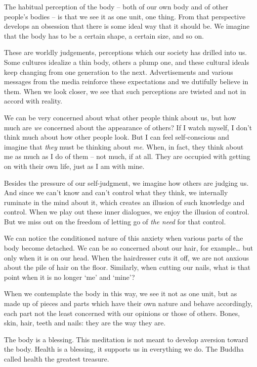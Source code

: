 The habitual perception of the body -- both of our own body and of other
people's bodies -- is that we see it as one unit, one thing. From that
perspective develops an obsession that there is some ideal way that it
should be. We imagine that the body has to be a certain shape, a certain
size, and so on.

These are worldly judgements, perceptions which our society has drilled
into us. Some cultures idealize a thin body, others a plump one, and
these cultural ideals keep changing from one generation to the next.
Advertisements and various messages from the media reinforce these
expectations and we dutifully believe in them. When we look closer, we
see that such perceptions are twisted and not in accord with reality.

We can be very concerned about what other people think about us, but how
much are \emph{we} concerned about the appearance of others? If I watch
myself, I don't think much about how other people look. But I can feel
self-conscious and imagine that \emph{they} must be thinking about
\emph{me}. When, in fact, they think about me as much as I do of them --
not much, if at all. They are occupied with getting on with their own
life, just as I am with mine.

Besides the pressure of our self-judgment, we imagine how others are
judging us. And since we can't know and can't control what they think,
we internally ruminate in the mind about it, which creates an illusion
of such knowledge and control. When we play out these inner dialogues,
we enjoy the illusion of control. But we miss out on the freedom of
letting go of \emph{the need} for that control.


We can notice the conditioned nature of this anxiety when various parts
of the body become detached. We can be so concerned about our hair, for
example\ldots{} but only when it is on our head. When the hairdresser
cuts it off, we are not anxious about the pile of hair on the floor.
Similarly, when cutting our nails, what is that point when it is no
longer `me' and `mine'?

When we contemplate the body in this way, we see it not as one unit, but
as made up of pieces and parts which have their own nature and behave
accordingly, each part not the least concerned with our opinions or
those of others. Bones, skin, hair, teeth and nails: they are the way
they are.

The body is a blessing. This meditation is not meant to develop aversion
toward the body. Health is a blessing, it supports us in everything we
do. The Buddha called health the greatest treasure.

